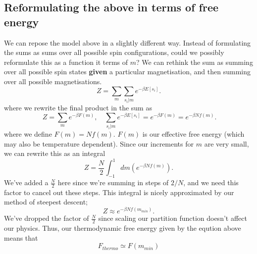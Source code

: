 \subsection{Reformulating the above in terms of free energy}
We can repose the model above in a slightly different way. Instead of formulating the sums as sums over all possible spin configurations, could we possibly reformulate this as a function it terms of $m$? We can rethink the sum as summing over all possible spin states \textbf{given} a particular  magnetisation, and then summing over all possible magnetisations. 
\[ 
	Z = \sum_m \sum_{s_i | m} e^{- \beta E[s_i]}. 
\] 
where we rewrite the final product in the sum as 
\[  
\	 Z = \sum_m e^{ - \beta F(m)}, \quad \sum_{s_i | m}e^{ - \beta E[s_i]} = e^{ - \beta F(m)} = e^{ - \beta N f(m)}. 
\] 
where we define $F(m) = N f(m)$. $F(m)$ is our effective free energy (which may also be temperature dependent). Since our increments for $m$ are very small, we can rewrite this as an integral 
\[ 
	Z = \frac{N}{ 2}  \int_{-1}^{1} dm \left(  e^{ - \beta N f(m)} \right) . 
\] 
We've added a $\frac{ N}{ 2} $ here since we're summing in steps of $2 / N$, and we need this factor to cancel out these steps. 
This integral is nicely approximated by our method of steepest descent; 
\[ 
	Z \approx e^{- \beta N f(m_{min})}. 
\]
We've dropped the factor of $\frac{N}{ 2} $ since scaling our partition function doesn't affect our physics. Thus, our thermodynamic free energy given by the eqution above means that \[ 
	F_{thermo} \simeq F(m_{min}) 
\] 
 
